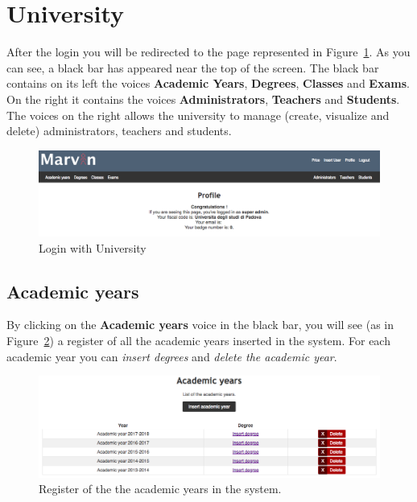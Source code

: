 \newpage
\section{University}
After the login you will be redirected to the page represented in Figure~\ref{fig:loggedProfile}. As you can see, a black bar has appeared near the top of the screen.
The black bar contains on its left the voices \textbf{Academic Years}, \textbf{Degrees}, \textbf{Classes} and \textbf{Exams}. On the right it contains the voices \textbf{Administrators}, \textbf{Teachers} and \textbf{Students}.
The voices on the right allows the university to manage (create, visualize and delete) administrators, teachers and students.
\begin{figure}[!h]
\centering
\includegraphics[width=1.0\textwidth]{img/loggedProfile.png}
\caption{Login with University}
\label{fig:loggedProfile}
\end{figure}

\subsection{Academic years}
By clicking on the \textbf{Academic years} voice in the black bar, you will see (as in Figure~\ref{fig:acadYear}) a register of all the academic years inserted in the system. For each academic year you can \emph{insert degrees} and \emph{delete the academic year}.
\begin{figure}[!h]
  \centering
  \includegraphics[width=1.0\textwidth]{img/accademicYears.png}
  \caption{Register of the the academic years in the system.}
  \label{fig:acadYear}
\end{figure}

